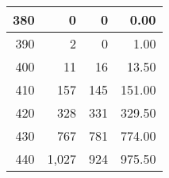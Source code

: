 \begin{longtable}{|r|r|r|r|}
		380                                                                                                                   & 0                                                    & 0                                                    & 0.00                                                                                                                   \\ \hline
		390                                                                                                                   & 2                                                    & 0                                                    & 1.00                                                                                                                   \\ \hline
		400                                                                                                                   & 11                                                   & 16                                                   & 13.50                                                                                                                  \\ \hline
		410                                                                                                                   & 157                                                  & 145                                                  & 151.00                                                                                                                 \\ \hline
		420                                                                                                                   & 328                                                  & 331                                                  & 329.50                                                                                                                 \\ \hline
		430                                                                                                                   & 767                                                  & 781                                                  & 774.00                                                                                                                 \\ \hline
		440                                                                                                                   & 1,027                                                & 924                                                  & 975.50                                                                                                                 \\ \hline

\end{longtable}
